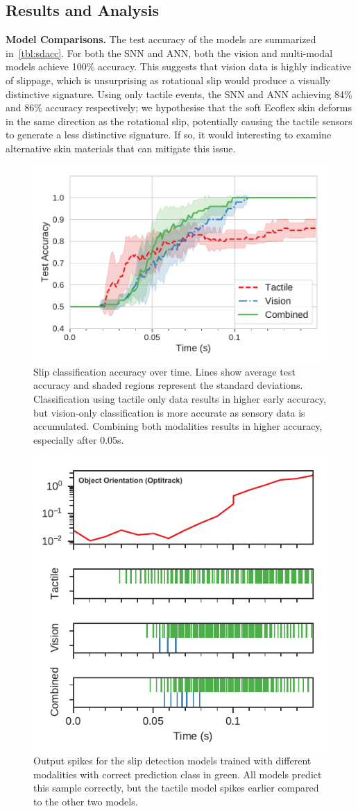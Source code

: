 \documentclass[fyp]{socreport}
\begin{document}
\subsection{Results and Analysis}

\vspace{0.3em}
\noindent\textbf{Model Comparisons.}
The test accuracy of the models are summarized in~\autoref{tbl:sdacc}. For
both the SNN and ANN, both the vision and multi-modal models achieve 100\%
accuracy. This suggests that vision data is highly indicative of slippage, which
is unsurprising as rotational slip would produce a visually distinctive
signature. Using only tactile events, the SNN and ANN achieving 84\% and 86\%
accuracy respectively; we hypothesise that the soft Ecoflex skin deforms in the
same direction as the rotational slip, potentially causing the tactile sensors
to generate a less distinctive signature. If so, it would interesting to examine
alternative skin materials that can mitigate this issue.


\begin{figure}
\centering
\includegraphics[width=0.55\columnwidth]{images/analysis/slip_over_time.pdf}
\caption{Slip classification accuracy over time. Lines show average test
  accuracy and shaded regions represent the standard deviations. Classification
  using tactile only data results in higher early accuracy, but vision-only
  classification is more accurate as sensory data is accumulated. Combining both
  modalities results in higher accuracy, especially after 0.05s.}
\label{fig:sliptime}
\end{figure}

\begin{figure}
\centering
\includegraphics[width=0.55\columnwidth]{images/analysis/slip_class_output.pdf}
\caption{Output spikes for the slip detection models trained with different modalities with correct prediction class in green. All models predict this sample correctly, but the tactile model spikes earlier compared to the other two models.}
\label{fig:spikeslip}
\end{figure}
\end{document}
